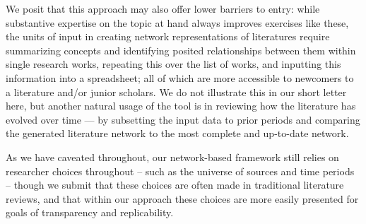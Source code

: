 \documentclass{cup-pan}
\begin{document}
We posit that this approach may also offer lower barriers to entry: while substantive expertise on the topic at hand always improves exercises like these, the units of input in creating network representations of literatures require summarizing concepts and identifying posited relationships between them within single research works, repeating this over the list of works, and inputting this information into a spreadsheet; all of which are more accessible to newcomers to a literature and/or junior scholars. We do not illustrate this in our short letter here, but another natural usage of the tool is in reviewing how the literature has evolved over time --- by subsetting the input data to prior periods and comparing the generated literature network to the most complete and up-to-date network.

As we have caveated throughout, our network-based framework still relies on researcher choices throughout -- such as the universe of sources and time periods -- though we submit that these choices are often made in traditional literature reviews, and that within our approach these choices are more easily presented for goals of transparency and replicability.
\\



\end{document}
